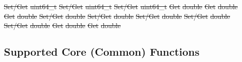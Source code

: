 \documentclass[12pt]{report} %
\providecommand{\DIFdeltex}[1]{{\protect\color{red}\sout{#1}}}                      %
\providecommand{\DIFdelend}{} %
\providecommand{\DIFdel}[1]{\texorpdfstring{\DIFdeltex{#1}}{}} %
\DeclareRobustCommand{\DIFdelend}{\DIFOaddend \let\includegraphics\DIFOincludegraphics} %
\begin{document}
\DIFdel{Set/Get }%
\DIFdel{uint64\_t }%
\DIFdel{Set/Get }%
\DIFdel{uint64\_t }%
\DIFdel{Set/Get }%
\DIFdel{uint64\_t }%
\DIFdel{Get }%
\DIFdel{double }%
\DIFdel{Get }%
\DIFdel{double }%
\DIFdel{Get }%
\DIFdel{double }%
\DIFdel{Set/Get }%
\DIFdel{double }%
\DIFdel{Set/Get }%
\DIFdel{double }%
\DIFdel{Set/Get }%
\DIFdel{double }%
\DIFdel{Set/Get }%
\DIFdel{double }%
\DIFdel{Set/Get }%
\DIFdel{double }%
\DIFdel{Get }%
\DIFdel{double }%
\DIFdel{Get }%
\DIFdel{double }%

\DIFdelend %
\subsection{Supported Core (Common) Functions}\label{sec:UserMCSupportedCommon}
\end{document}

